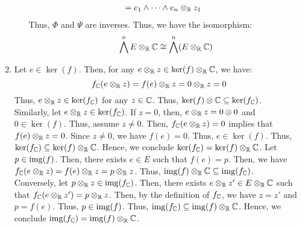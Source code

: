 \documentclass[12pt]{article}
\begin{document}
\begin{solution}
\begin{enumerate}
\begin{itemize}
\begin{align*}
                &= e_1 \wedge \cdots \wedge e_n \otimes_\mathbb R z_1
            \end{align*}
            Thus, $\Phi$ and $\Psi$ are inverses. Thus, we have the isomorphism:
            \[  \bigwedge^n E \otimes_\mathbb R \mathbb C \cong \bigwedge^n (E \otimes_\mathbb R \mathbb C)\]
        \end{itemize}
        \item Let $e \in \ker(f)$. Then, for any $e \otimes_\mathbb R z \in \ker(f) \otimes_\mathbb R \mathbb C$, we have:
        \[f_\mathbb C(e \otimes_\mathbb R z) = f(e) \otimes_\mathbb R z = 0 \otimes_\mathbb R z = 0 \]
        Thus, $e \otimes_\mathbb R z \in \ker(f_\mathbb C)$ for any $z \in \mathbb C$. Thus, $\ker(f) \otimes \mathbb C \subseteq \ker(f_\mathbb C)$. \\
        Similarly, let $e \otimes_\mathbb R z \in \ker(f_\mathbb C)$. If $z = 0$, then, $e \otimes_\mathbb R z = 0 \otimes 0$ and $0 \in \ker(f)$. Thus, assume $z \neq 0$. Then, $f_\mathbb C(e \otimes_\mathbb R z) = 0$ implies that $f(e) \otimes_\mathbb R z = 0$. Since $z \neq 0$, we have $f(e) = 0$. Thus, $e \in \ker(f)$. Thus, $\ker(f_\mathbb C) \subseteq \ker(f) \otimes_\mathbb R \mathbb C$. Hence, we conclude $\ker(f_\mathbb C) = \ker(f) \otimes_\mathbb R \mathbb C$. \bbni
        Let $p \in \operatorname{img}(f)$. Then, there exists $e \in E$ such that $f(e) = p$. Then, we have $f_\mathbb C(e \otimes_\mathbb R z) = f(e) \otimes_\mathbb R z = p \otimes_\mathbb R z$. Thus, $\operatorname{img}(f) \otimes_\mathbb R \mathbb C \subseteq \operatorname{img}(f_\mathbb C)$. \\
        Conversely, let $p \otimes_\mathbb R z \in \operatorname{img}(f_\mathbb C)$. Then, there exists $e \otimes_\mathbb R z' \in E \otimes_\mathbb R \mathbb C$ such that $f_\mathbb C(e \otimes_\mathbb R z') = p \otimes_\mathbb R z$. Then, by the definition of $f_\mathbb C$, we have $z = z'$ and $p = f(e)$. Thus, $p \in \operatorname{img}(f)$. Thus, $\operatorname{img}(f_\mathbb C) \subseteq \operatorname{img}(f) \otimes_\mathbb R \mathbb C$. Hence, we conclude $\operatorname{img}(f_\mathbb C) = \operatorname{img}(f) \otimes_\mathbb R \mathbb C$.
    \end{enumerate}
\end{solution}

\newpage
\end{document}
